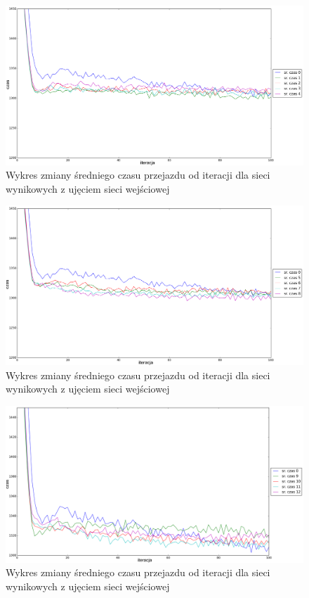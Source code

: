 \documentclass[twoside,12pt]{report}
\begin{document}
\begin{figure}[ht]
\centering
\includegraphics[width=1\textwidth]{img/iters/iters1}
\caption{Wykres zmiany średniego czasu przejazdu od iteracji dla sieci wynikowych z ujęciem sieci wejściowej}
\label{iters1}
\end{figure}

\begin{figure}[ht]
\centering
\includegraphics[width=1\textwidth]{img/iters/iters2}
\caption{Wykres zmiany średniego czasu przejazdu od iteracji dla sieci wynikowych z ujęciem sieci wejściowej}
\label{iters2}
\end{figure}

\begin{figure}[ht]
\centering
\includegraphics[width=1\textwidth]{img/iters/iters3}
\caption{Wykres zmiany średniego czasu przejazdu od iteracji dla sieci wynikowych z ujęciem sieci wejściowej}
\label{iters3}
\end{figure}
\end{document}

